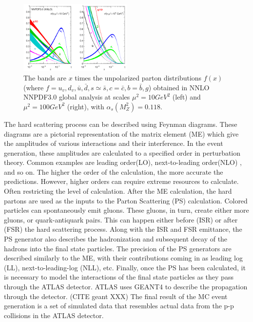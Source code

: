 \begin{figure}[h]
\begin{center}
\includegraphics*[width=0.50\textwidth] {figures/pdf2}
\caption{The bands are ${x}$ times the unpolarized parton distributions
${f(x)}$ (where ${f = u_{v}, d_{v}, \bar{u}, \bar{d}, s \simeq{} \bar{s}, c = \bar{c}, b = \bar{b}, g}$) obtained in NNLO NNPDF3.0
global analysis at scales ${\mu^{2} = 10 GeV^{2}}$
(left) and ${\mu^{2} = 100 GeV^{2}}$ (right), with
${\alpha_{s}(M^{2}_{Z}) = 0.118}$.}
\label{fig:pdf}
\end{center}
\end{figure}


\indent The hard scattering process can be described using Feynman diagrams. These diagrams are a pictorial representation of the matrix element (ME) which give the amplitudes of various interactions and their interference. In the event generation, these amplitudes are calculated to a specified order in perturbation theory. Common examples are leading order(LO), next-to-leading order(NLO) , and so on. The higher the order of the calculation, the more accurate the predictions. However, higher orders can require extreme resources to calculate. Often restricting the level of calculation. \linebreak
\indent  After the ME calculation, the hard partons are used as the inputs to the Parton Scattering (PS) calculation. Colored particles can spontaneously emit gluons. These gluons, in turn, create either more gluons, or quark-antiquark pairs. This can happen either before (ISR) or after (FSR) the hard scattering process. Along with the ISR and FSR emittance, the PS generator also describes the hadronization and subsequent decay of the hadrons into the final state particles. The precision of the PS generators are described similarly to the ME, with their contributions coming in as leading log (LL), next-to-leading-log (NLL), etc. \linebreak
\indent Finally, once the PS has been calculated, it is necessary to model the interactions of the final state particles as they pass through the ATLAS detector. ATLAS uses GEANT4 to describe the propagation through the detector. (CITE geant  XXX)\linebreak
\indent The final result of the MC event generation is a set of simulated data that resembles actual data from the p-p collisions in the ATLAS detector. 
